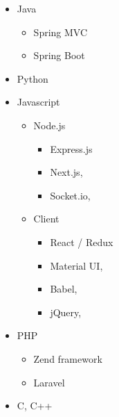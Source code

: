 \documentclass[10pt,a4paper,sans]{moderncv} %
\begin{document}
	\begin{cvcolumns}
		{
			\begin{itemize}
				\item Java
				\begin{itemize}
					\item Spring MVC
					\item Spring Boot
				\end{itemize}
				\item Python
				\item Javascript
				\begin{itemize}
					\item Node.js
					\begin{itemize}
						\item Express.js
						\item Next.js,
						\item Socket.io,
					\end{itemize}
					\item Client
					\begin{itemize}
						\item React / Redux
						\item Material UI,
						\item Babel,
						\item jQuery,
					\end{itemize}
				\end{itemize}
				\item PHP
				\begin{itemize}
					\item Zend framework
					\item Laravel
				\end{itemize}
				\item C, C++
			\end{itemize}
		}
		

\end{cvcolumns}
\end{document}

